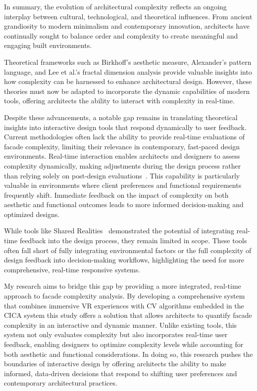 In summary, the evolution of architectural complexity reflects an ongoing interplay between cultural, technological, and theoretical influences.
From ancient grandiosity to modern minimalism and contemporary innovation, architects have continually sought to balance order and complexity to create meaningful and engaging built environments.

Theoretical frameworks such as Birkhoff's aesthetic measure, Alexander's pattern language, and Lee et al.'s fractal dimension analysis provide valuable insights into how complexity can be harnessed to enhance architectural design.
However, these theories must now be adapted to incorporate the dynamic capabilities of modern tools, offering architects the ability to interact with complexity in real-time.

Despite these advancements, a notable gap remains in translating theoretical insights into interactive design tools that respond dynamically to user feedback.
Current methodologies often lack the ability to provide real-time evaluations of facade complexity, limiting their relevance in contemporary, fast-paced design environments.
Real-time interaction enables architects and designers to assess complexity dynamically, making adjustments during the design process rather than relying solely on post-design evaluations~\cite{Krietemeyer2019}.
This capability is particularly valuable in environments where client preferences and functional requirements frequently shift.
Immediate feedback on the impact of complexity on both aesthetic and functional outcomes leads to more informed decision-making and optimized designs.

While tools like Shared Realities~\cite{Krietemeyer2019} demonstrated the potential of integrating real-time feedback into the design process, they remain limited in scope.
These tools often fall short of fully integrating environmental factors or the full complexity of design feedback into decision-making workflows, highlighting the need for more comprehensive, real-time responsive systems.

My research aims to bridge this gap by providing a more integrated, real-time approach to facade complexity analysis.
By developing a comprehensive system that combines immersive VR experiences with CV algorithms embedded in the CICA system this study offers a solution that allows architects to quantify facade complexity in an interactive and dynamic manner.
Unlike existing tools, this system not only evaluates complexity but also incorporates real-time user feedback, enabling designers to optimize complexity levels while accounting for both aesthetic and functional considerations.
In doing so, this research pushes the boundaries of interactive design by offering architects the ability to make informed, data-driven decisions that respond to shifting user preferences and contemporary architectural practices.